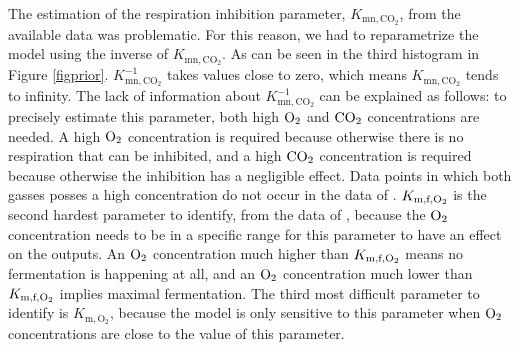 The estimation of the respiration inhibition parameter, $K_{\text{mn},\text{CO}_2}$, from the available data was problematic. For this reason, we had to reparametrize the model using the inverse of $K_{\text{mn},\text{CO}_2}$. As can be seen in the third histogram in Figure \ref{figprior}. $K_{\text{mn},\text{CO}_2}^{-1}$ takes values close to zero, which means $K_{\text{mn},\text{CO}_2}$ tends to infinity. The lack of information about $K_{\text{mn},\text{CO}_2}^{-1}$ can be explained as follows: to precisely estimate this parameter, both high $\text{O}_2$ and $\text{CO}_2$ concentrations are needed. A high $\text{O}_2$ concentration is required because otherwise there is no respiration that can be inhibited, and a high $\text{CO}_2$ concentration is required because otherwise the inhibition has a negligible effect. Data points in which both gasses posses a high concentration do not occur in the data of \textcite{ho}. $K_{\text{m,f},\text{O}_2}$ is the second hardest parameter to identify, from the data of \textcite{ho}, because the $\text{O}_2$ concentration needs to be in a specific range for this parameter to have an effect on the outputs. An $\text{O}_2$ concentration much higher than $K_{\text{m,f},\text{O}_2}$ means no fermentation is happening at all, and an $\text{O}_2$ concentration much lower than $K_{\text{m,f},\text{O}_2}$ implies maximal fermentation. The third most difficult parameter to identify is  $K_{\text{m},\text{O}_2}$, because the model is only sensitive to this parameter when $\text{O}_2$ concentrations are close to the value of this parameter.
